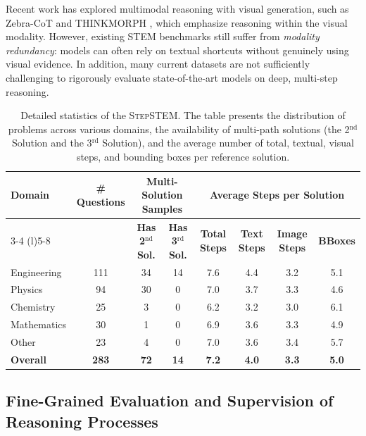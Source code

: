 \documentclass[11pt]{article}
\newcommand{\bench}{{\textsc{StepSTEM}}}
\begin{document}
Recent work has explored multimodal reasoning with visual generation, such as Zebra-CoT \cite{zebra} and THINKMORPH \cite{thinkmorph}, which emphasize reasoning within the visual modality. However, existing STEM benchmarks still suffer from \emph{modality redundancy}: models can often rely on textual shortcuts without genuinely using visual evidence. In addition, many current datasets are not sufficiently challenging to rigorously evaluate state-of-the-art models on deep, multi-step reasoning.

\begin{table}[t]
\centering\tabcolsep 2pt
\begin{tabular}{@{}lccccccc@{}}
\toprule
\multirow{2}{*}{\textbf{Domain}} & \multirow{2}{*}{\textbf{\# Questions}} & \multicolumn{2}{c}{\textbf{Multi-Solution Samples}} & \multicolumn{4}{c}{\textbf{Average Steps per Solution}} \\ \cmidrule(lr){3-4} \cmidrule(l){5-8}
 &  & \textbf{Has 2$^{\text{nd}}$ Sol.} & \textbf{Has 3$^{\text{rd}}$ Sol.} & \textbf{Total Steps} & \textbf{Text Steps} & \textbf{Image Steps} & \textbf{BBoxes} \\ \midrule
Engineering & 111 & 34 & 14 & 7.6 & 4.4 & 3.2 & 5.1 \\
Physics     & 94  & 30 & 0  & 7.0 & 3.7 & 3.3 & 4.6 \\
Chemistry   & 25  & 3  & 0  & 6.2 & 3.2 & 3.0 & 6.1 \\
Mathematics & 30  & 1  & 0  & 6.9 & 3.6 & 3.3 & 4.9 \\
Other   & 23  & 4  & 0  & 7.0 & 3.6 & 3.4 & 5.7 \\ \midrule
\textbf{Overall} & \textbf{283} & \textbf{72} & \textbf{14} & \textbf{7.2} & \textbf{4.0} & \textbf{3.3} & \textbf{5.0} \\ \bottomrule
\end{tabular}
\caption{Detailed statistics of the {\bench}. The table presents the distribution of problems across various domains, the availability of multi-path solutions (the 2$^{\text{nd}}$ Solution and the 3$^{\text{rd}}$ Solution), and the average number of total, textual, visual steps, and bounding boxes per reference solution.}
\label{tab:dataset_statistics}
\end{table}

\subsection{Fine-Grained Evaluation and Supervision of Reasoning Processes}
\end{document}

